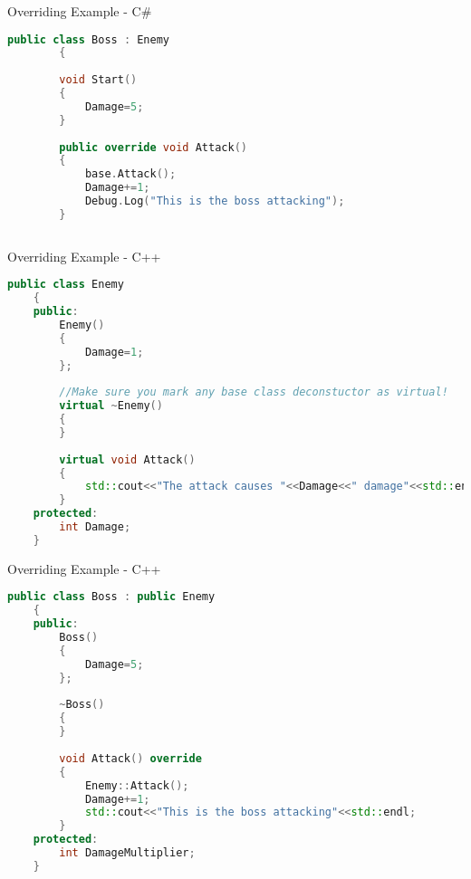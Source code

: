 \begin{frame}[fragile]{Overriding Example - C\#}
	\begin{lstlisting}[language=C++,basicstyle=\tiny,]
		public class Boss : Enemy
		{
		
		void Start()
		{
			Damage=5;
		}
		
		public override void Attack()
		{
			base.Attack();
			Damage+=1;
			Debug.Log("This is the boss attacking");
		}
		
	\end{lstlisting}
\end{frame}

\begin{frame}[fragile]{Overriding Example - C++}
	\begin{lstlisting}[language=C++,basicstyle=\tiny,]
	public class Enemy
	{
	public:
		Enemy()
		{
			Damage=1;
		};
		
		//Make sure you mark any base class deconstuctor as virtual!
		virtual ~Enemy()
		{
		}
	
		virtual void Attack()
		{
			std::cout<<"The attack causes "<<Damage<<" damage"<<std::endl;
		}
	protected:
		int Damage;
	}
	\end{lstlisting}
\end{frame}

\begin{frame}[fragile]{Overriding Example - C++}
	\begin{lstlisting}[language=C++,basicstyle=\tiny,]
	public class Boss : public Enemy
	{
	public:
		Boss()
		{
			Damage=5;
		};
	
		~Boss()
		{
		}
	
		void Attack() override
		{
			Enemy::Attack();
			Damage+=1;
			std::cout<<"This is the boss attacking"<<std::endl;
		}	
	protected:
		int DamageMultiplier;
	}
	\end{lstlisting}
\end{frame}


